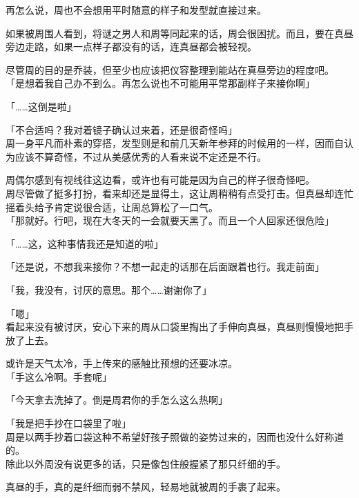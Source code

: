 再怎么说，周也不会想用平时随意的样子和发型就直接过来。

如果被周围人看到，将谜之男人和周等同起来的话，周会很困扰。而且，要在真昼旁边走路，如果一点样子都没有的话，连真昼都会被轻视。

尽管周的目的是乔装，但至少也应该把仪容整理到能站在真昼旁边的程度吧。\\

「是想着我自己办不到么。再怎么说也不可能用平常那副样子来接你啊」

「……这倒是啦」

「不合适吗？我对着镜子确认过来着，还是很奇怪吗」\\

周一身平凡而朴素的穿搭，发型则是和前几天新年参拜的时候用的一样，因而自认为应该不算奇怪，不过从美感优秀的人看来说不定还是不行。

周偶尔感到有视线往这边看，或许也有可能是因为自己的样子很奇怪吧。\\

周尽管做了挺多打扮，看来却还是显得土，这让周稍稍有点受打击。但真昼却连忙摇着头给予肯定说很合适，让周总算松了一口气。\\

「那就好。行吧，现在大冬天的一会就要天黑了。而且一个人回家还很危险」

「……这，这种事情我还是知道的啦」

「还是说，不想我来接你？不想一起走的话那在后面跟着也行。我走前面」

「我，我没有，讨厌的意思。那个……谢谢你了」

「嗯」\\

看起来没有被讨厌，安心下来的周从口袋里掏出了手伸向真昼，真昼则慢慢地把手放了上去。

或许是天气太冷，手上传来的感触比预想的还要冰凉。\\

「手这么冷啊。手套呢」

「今天拿去洗掉了。倒是周君你的手怎么这么热啊」

「我是把手抄在口袋里了啦」\\

周是以两手抄着口袋这种不希望好孩子照做的姿势过来的，因而也没什么好称道的。\\

除此以外周没有说更多的话，只是像包住般握紧了那只纤细的手。

真昼的手，真的是纤细而弱不禁风，轻易地就被周的手裹了起来。\\

